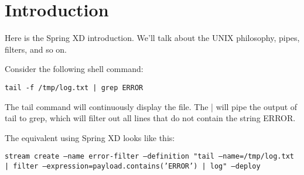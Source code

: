 \section{Introduction}

Here is the Spring XD introduction. We'll talk about the UNIX philosophy, pipes, filters, and so on.

Consider the following shell command:

\texttt{tail -f /tmp/log.txt | grep ERROR}

The tail command will continuously display the file. The | will pipe the output of tail to grep, which will filter out all lines that do not contain the string ERROR.

The equivalent using Spring XD looks like this:

\texttt{stream create --name error-filter --definition "tail --name=/tmp/log.txt | filter --expression=payload.contains('ERROR') | log" --deploy}

